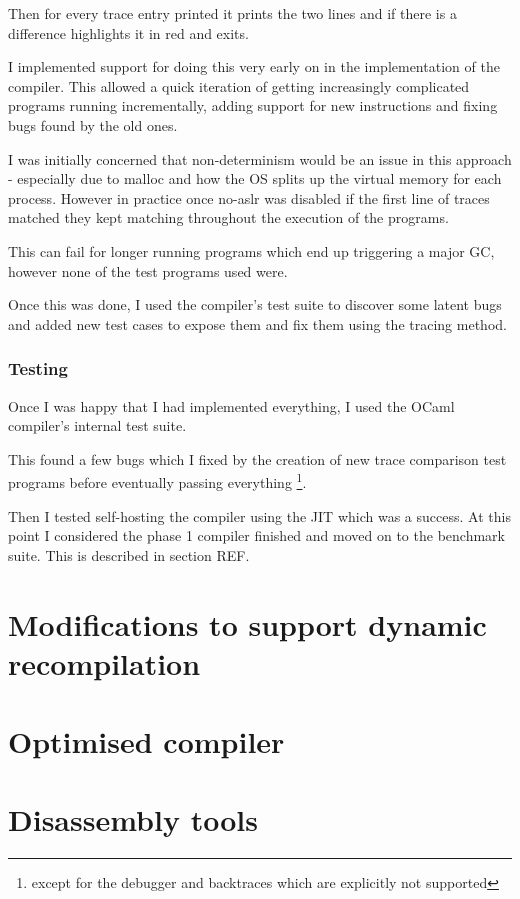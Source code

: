 Then for every trace entry printed it prints the two lines and if there is a difference highlights
it in red and exits.

I implemented support for doing this very early on in the implementation of the compiler. This
allowed a quick iteration of getting increasingly complicated programs running incrementally,
adding support for new instructions and fixing bugs found by the old ones.

I was initially concerned that non-determinism would be an issue in this approach - especially
due to malloc and how the OS splits up the virtual memory for each process. However in practice
once no-aslr was disabled if the first line of traces matched they kept matching throughout the
execution of the programs.

This can fail for longer running programs which end up triggering a major GC, however none of the
test programs used were.

Once this was done, I used the compiler's test suite to discover some latent bugs and added new
test cases to expose them and fix them using the tracing method.

\subsubsection{Testing}

Once I was happy that I had implemented everything, I used the OCaml compiler's internal test
suite.

This found a few bugs which I fixed by the creation of new trace comparison test programs before
eventually passing
everything \footnote{except for the debugger and backtraces which are explicitly not supported}.

Then I tested self-hosting the compiler using the JIT which was a success. At this point I
considered the phase 1 compiler finished and moved on to the benchmark suite. This is described in
section REF.

\section{Modifications to support dynamic recompilation}

\section{Optimised compiler}

\section{Disassembly tools}

